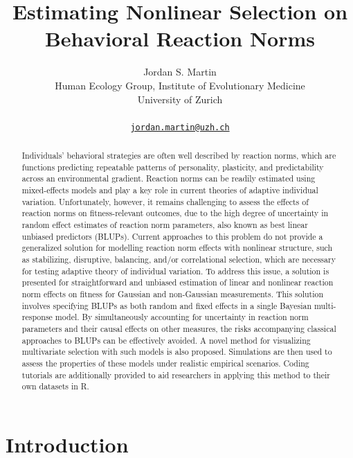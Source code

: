 \documentclass{article}
\title{Estimating Nonlinear Selection on \linebreak Behavioral Reaction
Norms}
\author{
    Jordan S. Martin
   \\
    Human Ecology Group, Institute of Evolutionary Medicine \\
    University of Zurich \\
   \\
  \texttt{\href{mailto:jordan.martin@uzh.ch}{\nolinkurl{jordan.martin@uzh.ch}}} \\
  }
\begin{document}
\maketitle

\def\tightlist{}


\begin{abstract}
Individuals' behavioral strategies are often well described by reaction
norms, which are functions predicting repeatable patterns of
personality, plasticity, and predictability across an environmental
gradient. Reaction norms can be readily estimated using mixed-effects
models and play a key role in current theories of adaptive individual
variation. Unfortunately, however, it remains challenging to assess the
effects of reaction norms on fitness-relevant outcomes, due to the high
degree of uncertainty in random effect estimates of reaction norm
parameters, also known as best linear unbiased predictors (BLUPs).
Current approaches to this problem do not provide a generalized solution
for modelling reaction norm effects with nonlinear structure, such as
stabilizing, disruptive, balancing, and/or correlational selection,
which are necessary for testing adaptive theory of individual variation.
To address this issue, a solution is presented for straightforward and
unbiased estimation of linear and nonlinear reaction norm effects on
fitness for Gaussian and non-Gaussian measurements. This solution
involves specifying BLUPs as both random and fixed effects in a single
Bayesian multi-response model. By simultaneously accounting for
uncertainty in reaction norm parameters and their causal effects on
other measures, the risks accompanying classical approaches to BLUPs can
be effectively avoided. A novel method for visualizing multivariate
selection with such models is also proposed. Simulations are then used
to assess the properties of these models under realistic empirical
scenarios. Coding tutorials are additionally provided to aid researchers
in applying this method to their own datasets in R.
\end{abstract}


\hypertarget{introduction}{%
\section{Introduction}\label{introduction}}
\end{document}
